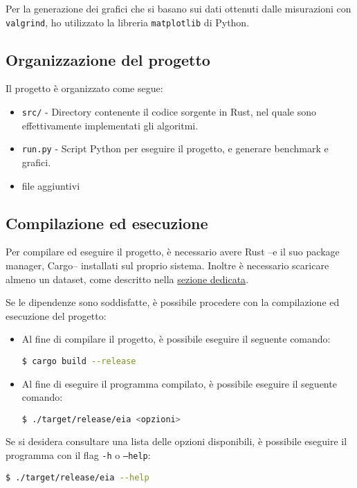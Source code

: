 \documentclass{article}
\begin{document}
Per la generazione dei grafici che si basano sui dati ottenuti dalle misurazioni con \texttt{valgrind},
ho utilizzato la libreria \texttt{matplotlib} di Python.

\subsection{Organizzazione del progetto}
Il progetto è organizzato come segue:
\begin{itemize}
	\item \texttt{src/} - Directory contenente il codice sorgente in Rust, nel quale sono effettivamente implementati gli algoritmi.
	\item \texttt{run.py} - Script Python per eseguire il progetto, e generare benchmark e grafici.
	\item file aggiuntivi
\end{itemize}

\subsection{Compilazione ed esecuzione}
Per compilare ed eseguire il progetto, è necessario avere Rust --e il suo package manager, Cargo-- installati sul proprio sistema.
Inoltre è necessario scaricare almeno un dataset, come descritto nella \hyperref[sec:dataset]{sezione dedicata}.
\vspace*{1em}

Se le dipendenze sono soddisfatte, è possibile procedere con la compilazione ed esecuzione del progetto:
\begin{itemize}
	\item Al fine di compilare il progetto, è possibile eseguire il seguente comando:

	      \lstinline[language=bash]|$ cargo build --release|

	\item Al fine di eseguire il programma compilato, è possibile eseguire il seguente comando:

	      \lstinline[language=bash]|$ ./target/release/eia <opzioni>|
\end{itemize}

Se si desidera consultare una lista delle opzioni disponibili, è possibile eseguire il programma con il flag \texttt{-h} o \texttt{--help}:

\lstinline[language=bash]|$ ./target/release/eia --help|
\vspace*{1em}
\end{document}
